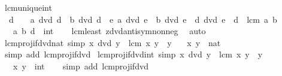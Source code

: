 \begin{isabellebody}
\isamarkupfalse%
\ lcm{\isacharunderscore}{\kern0pt}unique{\isacharunderscore}{\kern0pt}int{\isacharcolon}{\kern0pt}\isanewline
\ \ {\isachardoublequoteopen}d\ {\isasymge}\ {}\ {\isasymand}\ a\ dvd\ d\ {\isasymand}\ b\ dvd\ d\ {\isasymand}\ {\isacharparenleft}{\kern0pt}{\isasymforall}e{\isachardot}{\kern0pt}\ a\ dvd\ e\ {\isasymand}\ b\ dvd\ e\ {\isasymlongrightarrow}\ d\ dvd\ e{\isacharparenright}{\kern0pt}\ {\isasymlongleftrightarrow}\ d\ {\isacharequal}{\kern0pt}\ lcm\ a\ b{\isachardoublequoteclose}\isanewline
\ \ \ a\ b\ d\ {\isacharcolon}{\kern0pt}{\isacharcolon}{\kern0pt}\ int\isanewline
%
\isadelimproof
\ \ %
\endisadelimproof
%
\isatagproof
{}\isamarkupfalse%
\ lcm{\isacharunderscore}{\kern0pt}least\ zdvd{\isacharunderscore}{\kern0pt}antisym{\isacharunderscore}{\kern0pt}nonneg\ \isamarkupfalse%
\ auto%
\endisatagproof
{\isafoldproof}%
%
\isadelimproof
\isanewline
%
\endisadelimproof
\isanewline
{}\isamarkupfalse%
\ lcm{\isacharunderscore}{\kern0pt}proj{}{\isacharunderscore}{\kern0pt}if{\isacharunderscore}{\kern0pt}dvd{\isacharunderscore}{\kern0pt}nat\ {\isacharbrackleft}{\kern0pt}simp{\isacharbrackright}{\kern0pt}{\isacharcolon}{\kern0pt}\ {\isachardoublequoteopen}x\ dvd\ y\ {\isasymLongrightarrow}\ lcm\ x\ y\ {\isacharequal}{\kern0pt}\ y{\isachardoublequoteclose}\isanewline
\ \ \ x\ y\ {\isacharcolon}{\kern0pt}{\isacharcolon}{\kern0pt}\ nat\isanewline
%
\isadelimproof
\ \ %
\endisadelimproof
%
\isatagproof
{}\isamarkupfalse%
\ {\isacharparenleft}{\kern0pt}simp\ add{\isacharcolon}{\kern0pt}\ lcm{\isacharunderscore}{\kern0pt}proj{}{\isacharunderscore}{\kern0pt}if{\isacharunderscore}{\kern0pt}dvd{\isacharparenright}{\kern0pt}%
\endisatagproof
{\isafoldproof}%
%
\isadelimproof
\isanewline
%
\endisadelimproof
\isanewline
{}\isamarkupfalse%
\ lcm{\isacharunderscore}{\kern0pt}proj{}{\isacharunderscore}{\kern0pt}if{\isacharunderscore}{\kern0pt}dvd{\isacharunderscore}{\kern0pt}int\ {\isacharbrackleft}{\kern0pt}simp{\isacharbrackright}{\kern0pt}{\isacharcolon}{\kern0pt}\ {\isachardoublequoteopen}x\ dvd\ y\ {\isasymLongrightarrow}\ lcm\ x\ y\ {\isacharequal}{\kern0pt}\ {\isasymbar}y{\isasymbar}{\isachardoublequoteclose}\isanewline
\ \ \ x\ y\ {\isacharcolon}{\kern0pt}{\isacharcolon}{\kern0pt}\ int\isanewline
%
\isadelimproof
\ \ %
\endisadelimproof
%
\isatagproof
{}\isamarkupfalse%
\ {\isacharparenleft}{\kern0pt}simp\ add{\isacharcolon}{\kern0pt}\ lcm{\isacharunderscore}{\kern0pt}proj{}{\isacharunderscore}{\kern0pt}if{\isacharunderscore}{\kern0pt}dvd{\isacharparenright}{\kern0pt}%

\end{isabellebody}
